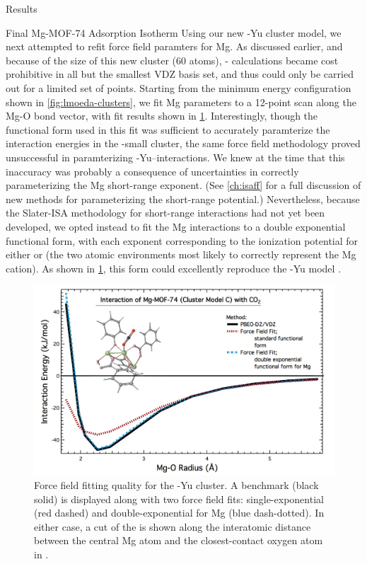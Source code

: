 \begin{section}{Results}
\begin{subsection}{Final Mg-MOF-74 {\co} Adsorption Isotherm}
Using our new \mgmof-Yu cluster model, we next attempted to refit
force field paramters for Mg. As discussed earlier, and
because of the size of this new cluster (60 atoms), \lmoeda-\pbeod
calculations became cost prohibitive in all but the smallest VDZ basis set, and
thus could only be carried out for a limited set of points. Starting from the minimum energy configuration
shown in \cref{fig:lmoeda-clusters}, we fit Mg parameters to a 12-point scan along the
Mg-O bond vector, with fit results shown in  
\cref{fig:lmoeda-xlarge_fit}. Interestingly, though the functional form used
in this fit was sufficient to accurately paramterize the interaction energies
in the \mgmof-small cluster, the same force field methodology proved
unsuccessful in paramterizing \mgmof-Yu--\co interactions. We knew at the time that
this inaccuracy was probably a consequence of uncertainties in correctly
parameterizing the Mg short-range exponent. (See \cref{ch:isaff} for a full
discussion of new methods for parameterizing the short-range potential.) Nevertheless, because the Slater-ISA methodology
for short-range interactions had not yet been developed, we opted instead to
fit the Mg interactions to a double exponential functional form, with each
exponent corresponding to the ionization potential for either  or
 (the two atomic environments most likely to correctly
represent the Mg cation). As shown in \cref{fig:lmoeda-xlarge_fit}, this
form could excellently reproduce the \mgmof-Yu model \pes.


    \begin{figure}
    \centering
    \includegraphics[width=1.0\textwidth]{lmoeda/xlarge_ff_fit.pdf}
    \caption[Force field fitting quality for \mgmof-Yu]
{Force field fitting quality for the \mgmof-Yu cluster. A \pbeod benchmark
(black solid) is displayed along with two force field fits: single-exponential
(red dashed) and double-exponential for Mg (blue dash-dotted). In either case,
a cut of the \pes is shown along the interatomic distance between the central
Mg atom and the closest-contact oxygen atom in \co.
            }
    \label{fig:lmoeda-xlarge_fit}
    \end{figure}



\end{subsection}
\end{section}
